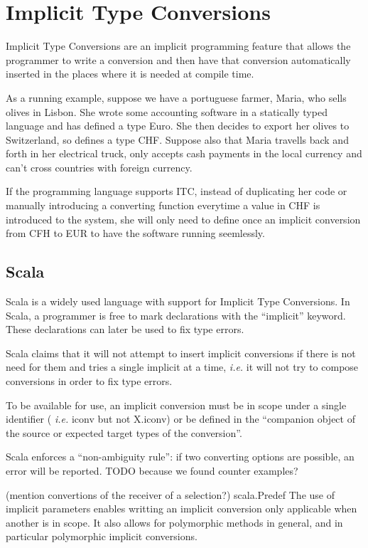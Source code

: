 \chapter{Implicit Type Conversions}
\label{cha:4}
Implicit Type Conversions are an implicit programming feature that allows the programmer to write a conversion and then have that conversion automatically inserted in the places where it is needed at compile time.

As a running example, suppose we have a portuguese farmer, Maria, who sells olives in Lisbon. She wrote some accounting software in a statically typed language and has defined a type Euro. She then decides to export her olives to Switzerland, so defines a type CHF. Suppose also that Maria travells back and forth in her electrical truck, only accepts cash payments in the local currency and can't cross countries with foreign currency.

If the programming language supports ITC, instead of duplicating her code or manually introducing a converting function everytime a value in CHF is introduced to the system, she will only need to define once an implicit conversion from CFH to EUR to have the software running seemlessly.
\section{Scala}
Scala is a widely used language with support for Implicit Type Conversions. In Scala, a programmer is free to mark declarations with the ``implicit'' keyword. These declarations can later be used to fix type errors.

Scala claims that it will not attempt to insert implicit conversions if there is not need for them and tries a single implicit at a time, \textit{i.e.} it will not try to compose conversions in order to fix type errors.

To be available for use, an implicit conversion must be in scope under a single identifier (\textit{ i.e.} iconv but not X.iconv) or be defined in the ``companion object of  the source or expected target types of the conversion''.

Scala enforces a ``non-ambiguity rule'': if two converting options are possible, an error will be reported. TODO because we found counter examples?

(mention convertions of the receiver of a selection?)
scala.Predef
The use of implicit parameters enables writting an implicit conversion only applicable when another is in scope. It also allows for polymorphic methods in general, and in particular polymorphic implicit conversions.

